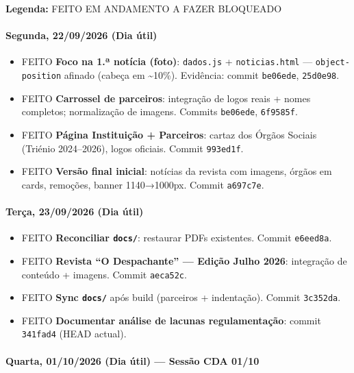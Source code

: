 \textbf{Legenda:} {FEITO} {EM ANDAMENTO} {A FAZER} {BLOQUEADO}

\paragraph{Segunda, 22/09/2026 (Dia
útil)}\label{segunda-22092026-dia-uxfatil}

\begin{itemize}
\tightlist
\item
  {FEITO} \textbf{Foco na 1.ª notícia (foto)}: \texttt{dados.js} +
  \texttt{noticias.html} --- \texttt{object-position} afinado (cabeça em
  \textasciitilde10\%). Evidência: commit \texttt{be06ede},
  \texttt{25d0e98}.
\item
  {FEITO} \textbf{Carrossel de parceiros}: integração de logos reais +
  nomes completos; normalização de imagens. Commits \texttt{be06ede},
  \texttt{6f9585f}.
\item
  {FEITO} \textbf{Página Instituição + Parceiros}: cartaz dos Órgãos
  Sociais (Triénio 2024--2026), logos oficiais. Commit \texttt{993ed1f}.
\item
  {FEITO} \textbf{Versão final inicial}: notícias da revista com
  imagens, órgãos em cards, remoções, banner 1140→1000px. Commit
  \texttt{a697c7e}.
\end{itemize}

\paragraph{Terça, 23/09/2026 (Dia
útil)}\label{teruxe7a-23092026-dia-uxfatil}

\begin{itemize}
\tightlist
\item
  {FEITO} \textbf{Reconciliar \texttt{docs/}}: restaurar PDFs
  existentes. Commit \texttt{e6eed8a}.
\item
  {FEITO} \textbf{Revista ``O Despachante'' --- Edição Julho 2026}:
  integração de conteúdo + imagens. Commit \texttt{aeca52c}.
\item
  {FEITO} \textbf{Sync \texttt{docs/}} após build (parceiros +
  indentação). Commit \texttt{3c352da}.
\item
  {FEITO} \textbf{Documentar análise de lacunas regulamentação}: commit
  \texttt{341fad4} (HEAD actual).
\end{itemize}

\paragraph{Quarta, 01/10/2026 (Dia útil) --- Sessão CDA
01/10}\label{quarta-01102026-dia-uxfatil-sessuxe3o-cda-0110}

